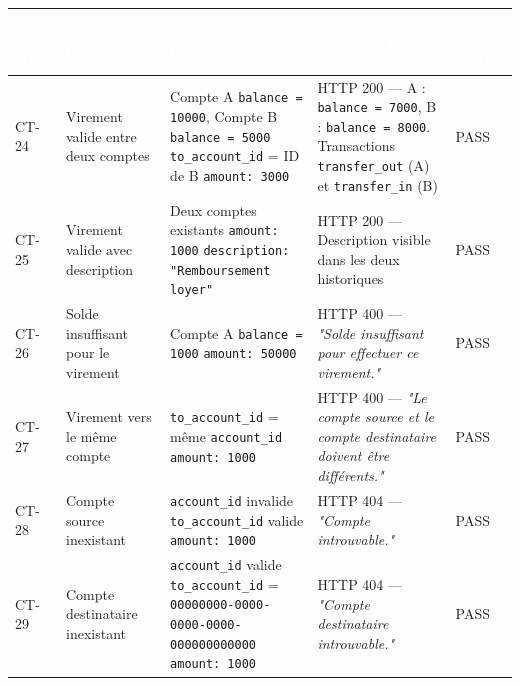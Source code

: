 \documentclass[12pt,a4paper]{article}
\begin{document}
\begin{longtable}{|L{1.6cm}|L{3.8cm}|L{5.2cm}|L{4.2cm}|L{1.8cm}|}
\hline
{}
\textbf{\textcolor{white}{Test Case ID}} & \textbf{\textcolor{white}{Test Case Description}} & \textbf{\textcolor{white}{Test Input (Test Case Value)}} & \textbf{\textcolor{white}{Expected Results}} & \textbf{\textcolor{white}{Test Case Status}} \\
\hline
CT-24 & Virement valide entre deux comptes & Compte A \texttt{balance = 10000}, Compte B \texttt{balance = 5000} \newline \texttt{to\_account\_id} = ID de B \newline \texttt{amount: 3000} & HTTP 200 — A : \texttt{balance = 7000}, B : \texttt{balance = 8000}. Transactions \texttt{transfer\_out} (A) et \texttt{transfer\_in} (B) & PASS \\
\hline
{}
CT-25 & Virement valide avec description & Deux comptes existants \newline \texttt{amount: 1000} \newline \texttt{description: "Remboursement loyer"} & HTTP 200 — Description visible dans les deux historiques & PASS \\
\hline
CT-26 & Solde insuffisant pour le virement & Compte A \texttt{balance = 1000} \newline \texttt{amount: 50000} & HTTP 400 — \textit{"Solde insuffisant pour effectuer ce virement."} & PASS \\
\hline
{}
CT-27 & Virement vers le même compte & \texttt{to\_account\_id} = même \texttt{account\_id} \newline \texttt{amount: 1000} & HTTP 400 — \textit{"Le compte source et le compte destinataire doivent être différents."} & PASS \\
\hline
CT-28 & Compte source inexistant & \texttt{account\_id} invalide \newline \texttt{to\_account\_id} valide \newline \texttt{amount: 1000} & HTTP 404 — \textit{"Compte introuvable."} & PASS \\
\hline
{}
CT-29 & Compte destinataire inexistant & \texttt{account\_id} valide \newline \texttt{to\_account\_id} = \texttt{00000000-0000-0000-0000-000000000000} \newline \texttt{amount: 1000} & HTTP 404 — \textit{"Compte destinataire introuvable."} & PASS \\
\hline
\end{longtable}
\end{document}
